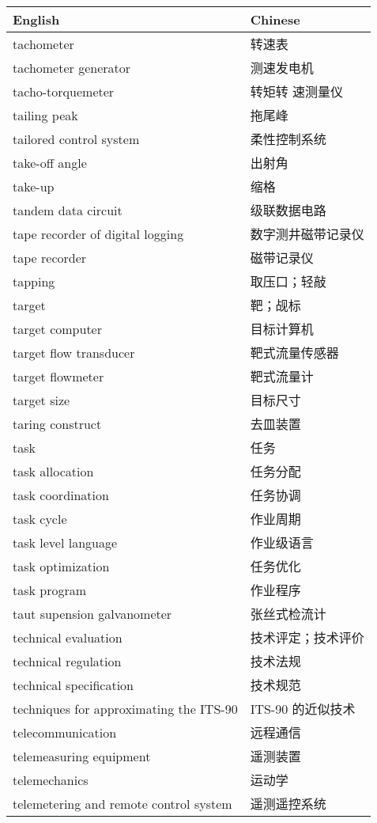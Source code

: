 \documentclass[
]{article}
\begin{document}
\begin{longtable}[]{@{}ll@{}}
\toprule()
English & Chinese \\
\midrule()
\endhead
tachometer & 转速表 \\
tachometer generator & 测速发电机 \\
tacho-torquemeter & 转矩转 速测量仪 \\
tailing peak & 拖尾峰 \\
tailored control system & 柔性控制系统 \\
take-off angle & 出射角 \\
take-up & 缩格 \\
tandem data circuit & 级联数据电路 \\
tape recorder of digital logging & 数字测井磁带记录仪 \\
tape recorder & 磁带记录仪 \\
tapping & 取压口；轻敲 \\
target & 靶；觇标 \\
target computer & 目标计算机 \\
target flow transducer & 靶式流量传感器 \\
target flowmeter & 靶式流量计 \\
target size & 目标尺寸 \\
taring construct & 去皿装置 \\
task & 任务 \\
task allocation & 任务分配 \\
task coordination & 任务协调 \\
task cycle & 作业周期 \\
task level language & 作业级语言 \\
task optimization & 任务优化 \\
task program & 作业程序 \\
taut supension galvanometer & 张丝式检流计 \\
technical evaluation & 技术评定；技术评价 \\
technical regulation & 技术法规 \\
technical specification & 技术规范 \\
techniques for approximating the ITS-90 & ITS-90 的近似技术 \\
telecommunication & 远程通信 \\
telemeasuring equipment & 遥测装置 \\
telemechanics & 运动学 \\
telemetering and remote control system & 遥测遥控系统 \\

\end{longtable}
\end{document}
